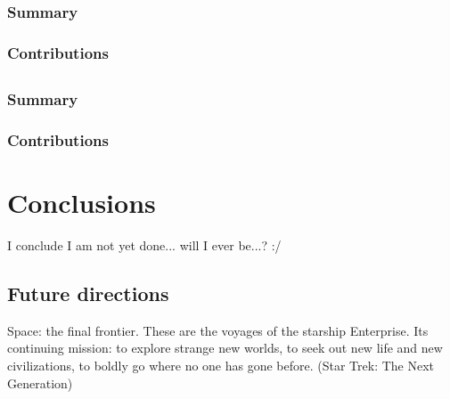 \documentclass[showtrims]{kthesis}
\begin{document}
\subsection{Summary}
\subsection{Contributions}

\section{\ppDSS}
\begingroup\centering
\begin{ppBox}
\end{ppBox}
\endgroup

\subsection{Summary}
\subsection{Contributions}


\chapter{Conclusions}
\renewcommand\thesection{\thechapter.\arabic{section}}
I conclude I am not yet done... will I ever be...? :/

\section{Future directions}
Space: the final frontier. These are the voyages of the starship Enterprise. Its 
continuing mission: to explore strange new worlds, to seek out new life and new 
civilizations, to boldly go where no one has gone before. (Star Trek: The Next Generation)


\end{document}
